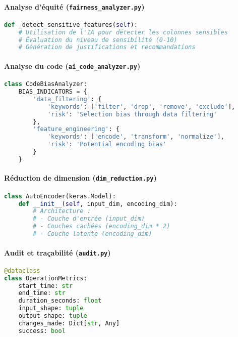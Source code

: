 \paragraph{Analyse d'équité (\texttt{fairness\_analyzer.py})}

\begin{lstlisting}[language=Python, caption=Détection des attributs sensibles]
def _detect_sensitive_features(self):
    # Utilisation de l'IA pour détecter les colonnes sensibles
    # Évaluation du niveau de sensibilité (0-10)
    # Génération de justifications et recommandations
\end{lstlisting}

\paragraph{Analyse du code (\texttt{ai\_code\_analyzer.py})}

\begin{lstlisting}[language=Python, caption=Analyse statique des biais]
class CodeBiasAnalyzer:
    BIAS_INDICATORS = {
        'data_filtering': {
            'keywords': ['filter', 'drop', 'remove', 'exclude'],
            'risk': 'Selection bias through data filtering'
        },
        'feature_engineering': {
            'keywords': ['encode', 'transform', 'normalize'],
            'risk': 'Potential encoding bias'
        }
    }
\end{lstlisting}

\paragraph{Réduction de dimension (\texttt{dim\_reduction.py})}

\begin{lstlisting}[language=Python, caption=Implémentation Autoencoder]
class AutoEncoder(keras.Model):
    def __init__(self, input_dim, encoding_dim):
        # Architecture :
        # - Couche d'entrée (input_dim)
        # - Couches cachées (encoding_dim * 2)
        # - Couche latente (encoding_dim)
\end{lstlisting}

\paragraph{Audit et traçabilité (\texttt{audit.py})}

\begin{lstlisting}[language=Python, caption=Structure des métriques d'opération]
@dataclass
class OperationMetrics:
    start_time: str
    end_time: str
    duration_seconds: float
    input_shape: tuple
    output_shape: tuple
    changes_made: Dict[str, Any]
    success: bool
\end{lstlisting}

